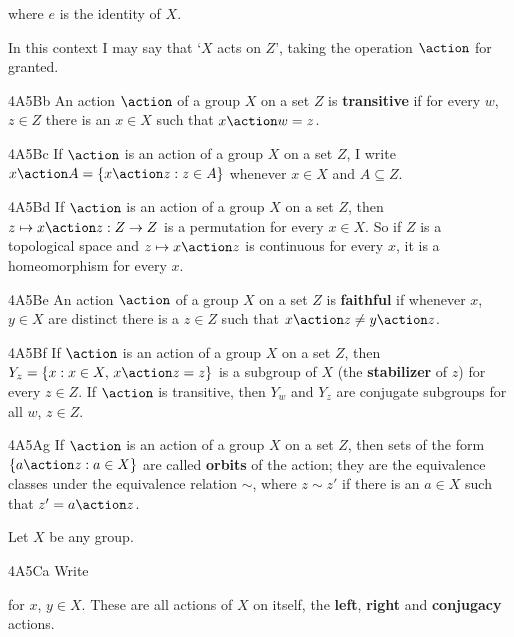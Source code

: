 
\noindent where $e$ is the identity of $X$.

In this context I may say that `$X$ acts on $Z$', taking the operation
$\action$ for granted.

\spheader 4A5Bb An action $\action$ of a group $X$ on a set $Z$ is
{\bf transitive} if for every $w$, $z\in Z$ there is an $x\in X$ such
that $x\action w=z$.

\spheader 4A5Bc If $\action$ is an action of a group $X$ on a set $Z$, I
write $x\action A=\{x\action z:z\in A\}$ whenever $x\in X$ and
$A\subseteq Z$.

\spheader 4A5Bd If $\action$ is an action of a group $X$ on a set $Z$,
then $z\mapsto x\action z:Z\to Z$ is a permutation for every $x\in X$.
   So if
$Z$ is a topological space and $z\mapsto x\action z$ is continuous for
every $x$, it is a homeomorphism for every $x$.

\spheader 4A5Be An action $\action$ of a group $X$ on a set $Z$ is {\bf
faithful} if whenever $x$, $y\in X$ are distinct there is a $z\in Z$
such that $x\action z\ne y\action z$.

\spheader 4A5Bf If $\action$ is an action of a group $X$ on a set $Z$,
then $Y_z=\{x:x\in X,\,x\action z=z\}$ is a subgroup of $X$ (the {\bf
stabilizer} of $z$) for every $z\in Z$.   If $\action$ is transitive,
then $Y_w$ and $Y_z$ are conjugate subgroups for all $w$, $z\in Z$.

\spheader 4A5Ag
If $\action$ is an action of a group $X$ on a set $Z$,
then sets of the form $\{a\action z:a\in X\}$ are called {\bf orbits} of
the action;  they are the equivalence classes under the equivalence
relation $\sim$, where $z\sim z'$ if there is an $a\in X$ such that
$z'=a\action z$.

 Let $X$ be any group.

\spheader 4A5Ca Write


\noindent for $x$, $y\in X$.   These are all actions of $X$ on itself,
the {\bf left}, {\bf right} and {\bf conjugacy} actions.

